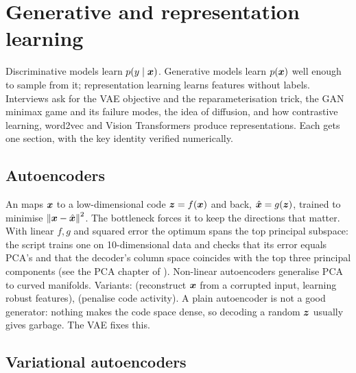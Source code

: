 \chapter{Generative and representation learning}
\label{ch:generative}

Discriminative models learn $p(y\mid{\bm{x}})$. Generative models learn $p({\bm{x}})$ well enough to sample
from it; representation learning learns features without labels. Interviews ask for the VAE
objective and the reparameterisation trick, the GAN minimax game and its failure modes, the idea
of diffusion, and how contrastive learning, word2vec and Vision Transformers produce
representations. Each gets one section, with the key identity verified numerically.

\section{Autoencoders}

An  maps ${\bm{x}}$ to a low-dimensional code ${\bm{z}}=f({\bm{x}})$ and back,
$\hat{{\bm{x}}}=g({\bm{z}})$, trained to minimise $\left\lVert {\bm{x}}-\hat{{\bm{x}}} \right\rVert^2$. The bottleneck forces it to keep the
directions that matter. With linear $f,g$ and squared error the optimum spans the top principal
subspace: the script trains one on 10-dimensional data and checks that its error equals PCA's and
that the decoder's column space coincides with the top three principal components (see the PCA
chapter of ). Non-linear autoencoders generalise PCA to curved
manifolds. Variants:  (reconstruct ${\bm{x}}$ from a corrupted input, learning robust
features),  (penalise code activity). A plain autoencoder is not a good generator:
nothing makes the code space dense, so decoding a random ${\bm{z}}$ usually gives garbage. The VAE fixes this.

\section{Variational autoencoders}

